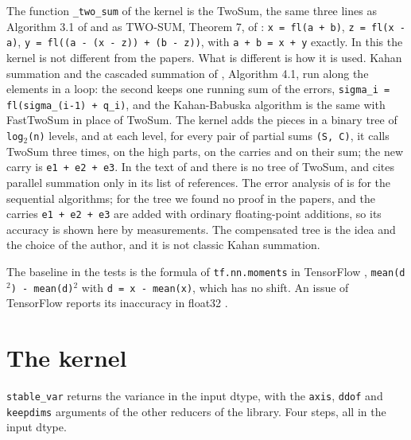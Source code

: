 \documentclass[11pt]{article}
\begin{document}
The function \texttt{\_two\_sum} of the kernel is the TwoSum, the same three lines as Algorithm 3.1 of \cite{ogita2005} and as TWO-SUM, Theorem 7, of \cite{shewchuk1997}: \texttt{x = fl(a + b)}, \texttt{z = fl(x - a)}, \texttt{y = fl((a - (x - z)) + (b - z))}, with \texttt{a + b = x + y} exactly. In this the kernel is not different from the papers. What is different is how it is used. Kahan summation \cite{healy2022} and the cascaded summation of \cite{ogita2005}, Algorithm 4.1, run along the elements in a loop: the second keeps one running sum of the errors, \texttt{sigma\_i = fl(sigma\_(i-1) + q\_i)}, and the Kahan-Babuska algorithm is the same with FastTwoSum in place of TwoSum. The kernel adds the pieces in a binary tree of \texttt{log$_{2}$(n)} levels, and at each level, for every pair of partial sums \texttt{(S, C)}, it calls TwoSum three times, on the high parts, on the carries and on their sum; the new carry is \texttt{e1 + e2 + e3}. In the text of \cite{ogita2005} and \cite{healy2022} there is no tree of TwoSum, and \cite{ogita2005} cites parallel summation only in its list of references. The error analysis of \cite{ogita2005} is for the sequential algorithms; for the tree we found no proof in the papers, and the carries \texttt{e1 + e2 + e3} are added with ordinary floating-point additions, so its accuracy is shown here by measurements. The compensated tree is the idea and the choice of the author, and it is not classic Kahan summation.

The baseline in the tests is the formula of \texttt{tf.nn.moments} in TensorFlow \cite{tfmoments}, \texttt{mean(d$^{2}$) - mean(d)$^{2}$} with \texttt{d = x - mean(x)}, which has no shift. An issue of TensorFlow reports its inaccuracy in float32 \cite{tfissue}.

\section{The kernel}

\texttt{stable\_var} returns the variance in the input dtype, with the \texttt{axis}, \texttt{ddof} and \texttt{keepdims} arguments of the other reducers of the library. Four steps, all in the input dtype.
\end{document}
